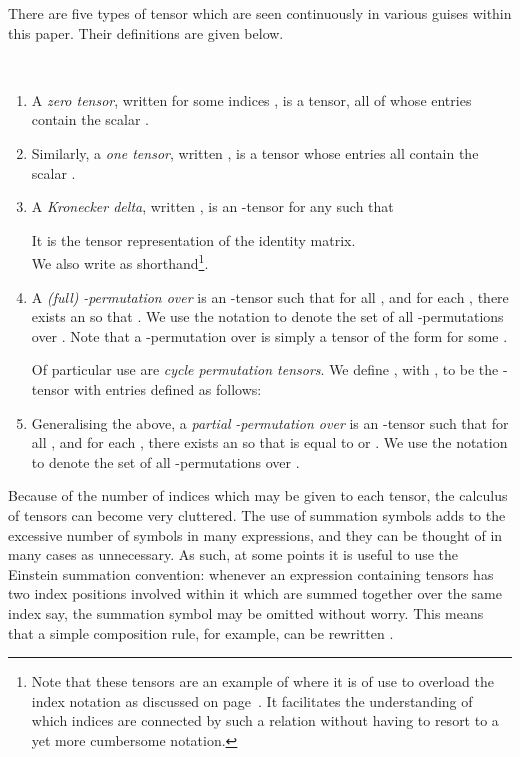 \documentclass{LMCS}
\theoremstyle{plain}\newtheorem*{cLm}{Claim}
\newcommand{\p}{} \newcommand{\N}{\mathbb{N}}
\newcommand{\hugh}[1]{#1}
\newcommand{\hughf}[1]{#1}
\begin{document}
\p There are \hugh{five types of tensor} which are seen continuously in various guises within this \hughf{paper}. Their definitions are given below.
\begin{defi}\label{TensorExamDefns}  \\
\begin{enumerate}
\item A \emph{zero tensor}, written  for some indices , is a tensor, all of whose entries contain the scalar .
\item Similarly, a \emph{one tensor}, written , is a tensor whose entries all contain the scalar .
\item A \emph{Kronecker delta}, written , is an -tensor for any  such that

It is the tensor representation of the identity matrix. \\ \hugh{We also write  as shorthand}\footnote{\hughf{Note that these tensors are an example of where it is of use to overload the index notation as discussed on page~\pageref{OverloadRef}. It facilitates the understanding of which indices are connected by such a relation without having to resort to a yet more cumbersome notation.}}.
\item \hugh{A \emph{(full)} \emph{-permutation over } is an
  -tensor  such that for all , and  for each , there exists an
   so that . We use the notation  to
  denote the set of all {-permutations} over . Note that a -permutation over  is simply a tensor of the form  for some .}
  
  \p \hugh{Of particular use are \emph{cycle permutation tensors}. We define , with , to be the -tensor with entries defined as follows:
  }
\item \hugh{Generalising the above, a \emph{partial} \emph{-permutation over } is an
  -tensor  such that for all , and  for each , there exists an
   so that  is equal to  or . We use the notation  to
  denote the set of all -permutations over .}
\end{enumerate}
\end{defi}

\noindent Because of the number of indices which may be given to each tensor, the calculus of tensors can become very cluttered. The use of summation symbols adds to the excessive number of symbols in many expressions, and they can be thought of in many cases as unnecessary. As such, at some points it is useful to use the Einstein summation convention: whenever an expression containing tensors has two index positions involved within it which are summed together over the same index  say, the summation symbol may be omitted without worry. This means that a simple composition rule, for example, can be rewritten .
\end{document}
